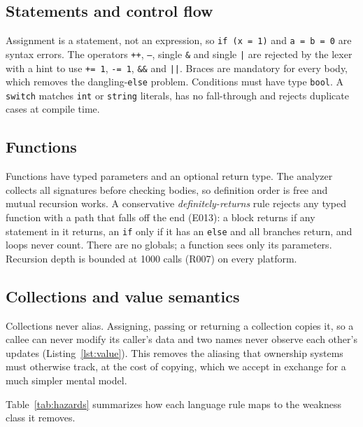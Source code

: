 \documentclass[conference]{IEEEtran}
\begin{document}
\subsection{Statements and control flow}
Assignment is a statement, not an expression, so \texttt{if (x = 1)} and \texttt{a = b = 0} are syntax
errors. The operators \texttt{++}, \texttt{--}, single \texttt{\&} and single \texttt{|} are rejected by the
lexer with a hint to use \texttt{+= 1}, \texttt{-= 1}, \texttt{\&\&} and \texttt{||}. Braces are mandatory
for every body, which removes the dangling-\texttt{else} problem. Conditions must have type \texttt{bool}.
A \texttt{switch} matches \texttt{int} or \texttt{string} literals, has no fall-through and rejects
duplicate cases at compile time.

\subsection{Functions}
Functions have typed parameters and an optional return type. The analyzer collects all signatures before
checking bodies, so definition order is free and mutual recursion works. A conservative
\emph{definitely-returns} rule rejects any typed function with a path that falls off the end (E013): a block
returns if any statement in it returns, an \texttt{if} only if it has an \texttt{else} and all branches
return, and loops never count. There are no globals; a function sees only its parameters. Recursion depth is
bounded at 1000 calls (R007) on every platform.

\subsection{Collections and value semantics}
Collections never alias. Assigning, passing or returning a collection copies it, so a callee can never
modify its caller's data and two names never observe each other's updates (Listing~\ref{lst:value}). This
removes the aliasing that ownership systems must otherwise track, at the cost of copying, which we accept in
exchange for a much simpler mental model.



Table~\ref{tab:hazards} summarizes how each language rule maps to the weakness class it removes.

\end{document}
